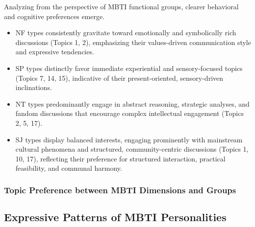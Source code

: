 \documentclass[12pt]{article}
\begin{document}
	Analyzing from the perspective of MBTI functional groups, clearer behavioral and cognitive preferences emerge.
	\begin{itemize}
	\item NF types consistently gravitate toward emotionally and symbolically rich discussions (Topics 1, 2), emphasizing their values-driven communication style and expressive tendencies. 
	\item SP types distinctly favor immediate experiential and sensory-focused topics (Topics 7, 14, 15), indicative of their present-oriented, sensory-driven inclinations. 
	\item NT types predominantly engage in abstract reasoning, strategic analyses, and fandom discussions that encourage complex intellectual engagement (Topics 2, 5, 17).
	\item SJ types display balanced interests, engaging prominently with mainstream cultural phenomena and structured, community-centric discussions (Topics 1, 10, 17), reflecting their preference for structured interaction, practical feasibility, and communal harmony.
	\end{itemize}
	
	\subsubsection{Topic Preference between MBTI Dimensions and Groups}
	

	
	
	
	
	
	\subsection{Expressive Patterns of MBTI Personalities}
\end{document}
